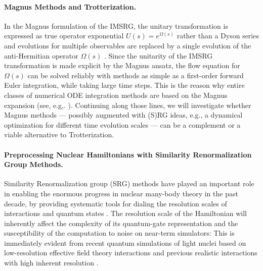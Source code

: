 \documentclass[11pt]{article}
\begin{document}
\paragraph{Magnus Methods and Trotterization.}
In the Magnus formulation of the IMSRG, the unitary transformation is expressed as true operator exponential $U(s)=e^{\Omega(s)}$ rather than a Dyson series and evolutions for multiple observables are replaced by a single evolution of the anti-Hermitian operator $\Omega(s)$ \cite{Morris:2015ve}. Since the unitarity of the IMSRG transformation is made explicit by the Magnus ansatz, the flow equation for $\Omega(s)$ can be solved reliably with methods as simple as a first-order forward Euler integration, while taking large time steps. This is the reason why entire classes of numerical ODE integration methods are based on the Magnus expansion (see, e.g,. \cite{Blanes:2009fk}).
Continuing along those lines, we will investigate whether Magnus methods --- possibly augmented with (S)RG ideas, e.g., a dynamical optimization for different time evolution scales --- can be a complement or a viable alternative to Trotterization.

\paragraph{Preprocessing Nuclear Hamiltonians with Similarity Renormalization Group Methods.} Similarity Renormalization group (SRG) methods have played an important role in enabling the enormous progress in nuclear many-body theory in the past decade, by providing systematic tools for dialing the resolution scales of interactions and quantum states \cite{Bogner:2010pq,Hergert:2016jk,Hergert:2017kx,Stroberg:2019mx}. The resolution scale of the Hamiltonian will inherently affect the complexity of its quantum-gate representation and the susceptibility of the computation to noise on near-term simulators: This is immediately evident from recent quantum simulations of light nuclei based on low-resolution effective field theory interactions \cite{Dumitrescu:2018az,Lu:2018aq} and previous realistic interactions with high inherent resolution \cite{Roggero:2019sr}.
\end{document}
